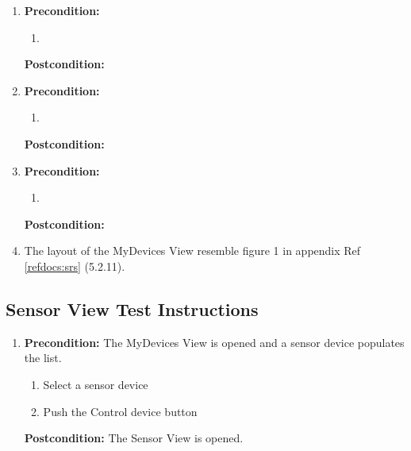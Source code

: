 \documentclass[a4paper]{article}
\newlength{\testlabellength}
\newenvironment{testlist}{\begin{enumerate}[label=\bfseries Instruction \thesubsection.\arabic* , labelindent=0pt, labelwidth=\testlabellength , leftmargin=2cm]}{\end{enumerate}}
\begin{document}
\begin{appendices}
\begin{testlist}
    \item \vspace{5mm} \textbf{Precondition:} 
    			\begin{enumerate}
                    \item 
                \end{enumerate}
                \textbf{Postcondition:} 
   
    \item \vspace{5mm} \textbf{Precondition:} 
    			\begin{enumerate}
                    \item 
                \end{enumerate}
                \textbf{Postcondition:} 
   
    \item \vspace{5mm} \textbf{Precondition:} 
    			\begin{enumerate}
                    \item 
                \end{enumerate}
                \textbf{Postcondition:} 
    
    \item The layout of the MyDevices View resemble figure 1 in appendix  Ref \ref{refdocs:srs} (5.2.11).
\end{testlist}

\subsection{Sensor View Test Instructions}
\begin{testlist}
 \item \vspace{5mm} \textbf{Precondition:} The MyDevices View is opened and a sensor device populates the list.
    			\begin{enumerate}
    				\item Select a sensor device
    				\item Push the Control device button
    			\end{enumerate}
    			\textbf{Postcondition:} The Sensor View is opened. 


\end{testlist}
\end{appendices}
\end{document}
